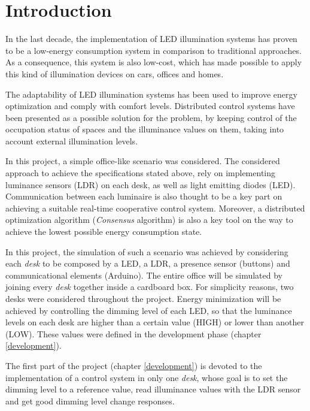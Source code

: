 \documentclass[english,fira]{ist-report}
\begin{document}
{\hypersetup{linkcolor = black} \tableofcontents}

\section{Introduction}

In the last decade, the implementation of LED illumination systems has proven to be a low-energy consumption system in comparison to traditional approaches. As a consequence, this system is also low-cost, which has made possible to apply this kind of illumination devices on cars, offices and homes.

The adaptability of LED illumination systems has been used to improve energy optimization and comply with comfort levels. Distributed control systems have been presented as a possible solution for the problem, by keeping control of the occupation status of spaces and the illuminance values on them, taking into account external illumination levels.

In this project, a simple office-like scenario was considered. The considered approach to achieve the specifications stated above, rely on implementing luminance sensors (LDR) on each desk, as well as light emitting diodes (LED). Communication between each luminaire is also thought to be a key part on achieving a suitable real-time cooperative control system. Moreover, a distributed optimization algorithm (\textit{Consensus} algorithm) is also a key tool on the way to achieve the lowest possible energy consumption state.

In this project, the simulation of such a scenario was achieved by considering each \textit{desk} to be composed by a LED, a LDR, a presence sensor (buttons) and communicational elements (Arduino). The entire office will be simulated by joining every \textit{desk} together inside a cardboard box. For simplicity reasons, two desks were considered throughout the project. Energy minimization will be achieved by controlling the dimming level of each LED, so that the luminance levels on each desk are higher than a certain value (HIGH) or lower than another (LOW). These values were defined in the development phase (chapter \ref{development}). 

The first part of the project (chapter \ref{development}) is devoted to the implementation of a control system in only one \textit{desk}, whose goal is to set the dimming level to a reference value, read illuminance values with the LDR sensor and get good dimming level change responses.
\end{document}
